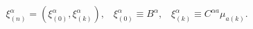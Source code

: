 \begin{equation}
\xi _{(n)}^{\alpha }=(\xi _{(0)}^{\alpha },\xi _{(k)}^{\alpha }),\;\;\;\xi
_{(0)}^{\alpha }\equiv B^{\alpha },\;\;\;\xi _{(k)}^{\alpha }\equiv
C^{\alpha a}\mu _{a(k)}.  \label{g_param}
\end{equation}

